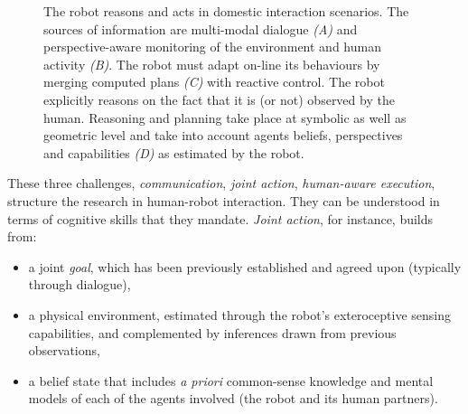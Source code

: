 \documentclass[preprint,3p,times]{elsarticle}
\begin{document}
\begin{figure}[htb]
\centering
{}

\caption{The robot reasons and acts in domestic interaction scenarios.  The
    sources of information are multi-modal dialogue {\it (A)} and
    perspective-aware monitoring of the environment and human activity {\it
    (B)}. The robot must adapt on-line its behaviours by merging computed plans
    {\it (C)} with reactive control. The robot explicitly reasons on the fact
    that it is (or not) observed by the human. Reasoning and planning take place
    at symbolic as well as geometric level and take into account agents beliefs,
    perspectives and capabilities {\it (D)} as estimated by the robot.}

\label{fig:hri-dec}
\end{figure}

These three challenges, \emph{communication}, \emph{joint action},
\emph{human-aware execution}, structure the research in human-robot
interaction. They can be understood in terms of cognitive skills that they
mandate. \emph{Joint action}, for instance, builds from:

\begin {itemize}
    \item a joint \emph{goal}, which has been previously established and agreed
        upon (typically through dialogue),
    
    \item a physical environment, estimated through the robot's exteroceptive
        sensing capabilities, and complemented by inferences drawn from previous
        observations,
    
    \item a belief state that includes {\it a priori} common-sense knowledge and
        mental models of each of the agents involved (the robot and its human partners).

\end {itemize}
\end{document}
